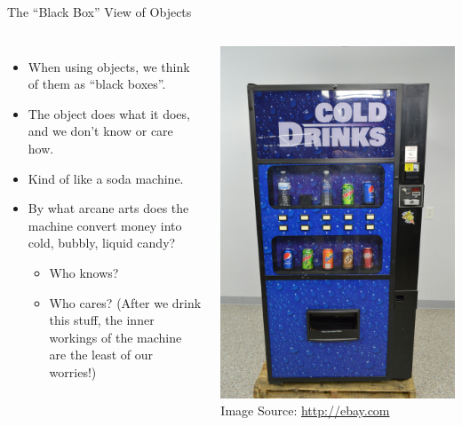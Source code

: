 \documentclass[]{beamer}
\begin{document}
\begin{frame}{The ``Black Box'' View of Objects}
\begin{columns}
    \begin{itemize}[<+->]
        \item When using objects, we think of them as ``black boxes''.
        \item The object does what it does, and we don't know or care
            how.
        \item Kind of like a soda machine.  
        \item By what arcane arts does the machine convert money into
            cold, bubbly, liquid candy?  
            \begin{itemize}
                \item Who knows?
                \item Who cares? (After we drink this stuff, the inner
                workings of the machine are the least of our worries!)
            \end{itemize}
    \end{itemize}

    \includegraphics[width=\textwidth]{images/soda}
    {\tiny Image Source: \url{http://ebay.com}}
\end{columns}
\end{frame}
\end{document}
